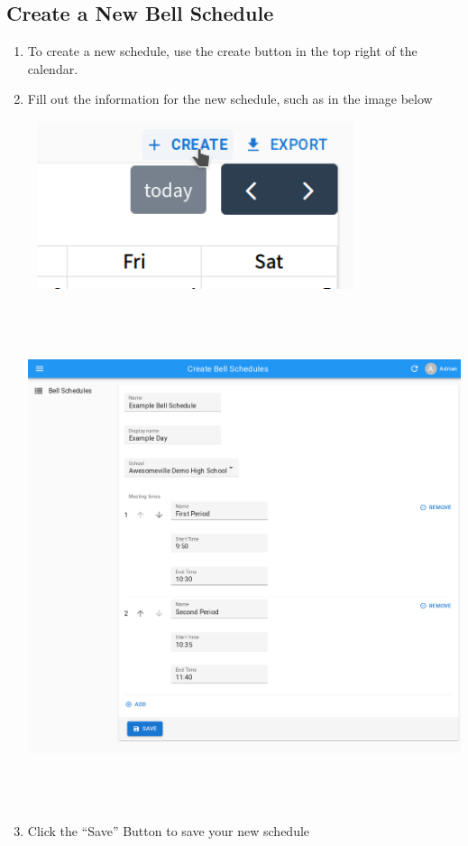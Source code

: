 \documentclass{article}
\begin{document}
\begin{enumerate}
\begin{center}
\end{center}
\end{enumerate}
\subsection{Create a New Bell Schedule}
\begin{enumerate}
\item {To create a new schedule, use the create button in the top right of the calendar.}
\item {Fill out the information for the new schedule, such as in the image below}
\begin{center}
\includegraphics[width=3.8693in,height=1.9382in]{Mini20Manual-img010.png}
\end{center}
\begin{center}
\includegraphics[width=6.5in,height=5.7717in]{Mini20Manual-img011.png}
\end{center}
\item {Click the “Save” Button to save your new schedule}
\end{enumerate}
\end{document}
